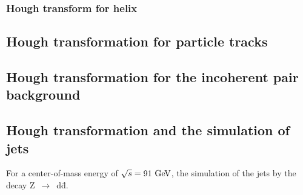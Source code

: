 \subsubsection{Hough transform for helix}

\subsection{Hough transformation for particle tracks}
\subsection{Hough transformation for the incoherent pair background}
\subsection{Hough transformation and the simulation of jets}

For a center-of-mass energy of $\sqrt{s} = 91 \,\mathrm{\,Ge\kern -0.1em V}$, the simulation of the jets by the decay Z~$\rightarrow$~d\={d}.

